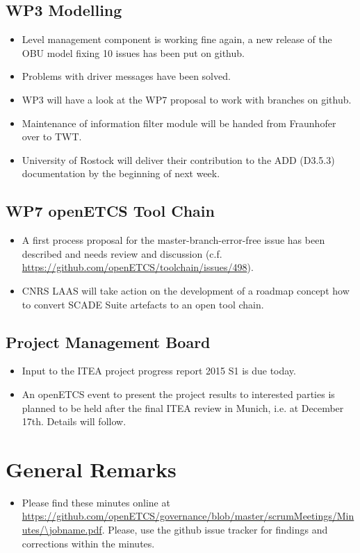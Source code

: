 \documentclass[a4paper, 11pt]{article}
\begin{document}
\subsection{WP3 Modelling}

\begin{itemize}
\item Level management component is working fine again, a new release of the OBU model fixing 10 issues has been put on github.
\item Problems with driver messages have been solved.
\item WP3 will have a look at the WP7 proposal to work with branches on github.
\item Maintenance of information filter module will be handed from Fraunhofer over to TWT.
\item University of Rostock will deliver their contribution to the ADD (D3.5.3) documentation by the beginning of next week.
\end{itemize}

\subsection{WP7 openETCS Tool Chain}

\begin{itemize}
\item A first process proposal for the master-branch-error-free issue has been described and needs review and discussion (c.f. \url{https://github.com/openETCS/toolchain/issues/498}).
\item CNRS LAAS will take action on the development of a roadmap concept how to convert SCADE Suite artefacts to an open tool chain.
\end{itemize}

\subsection{Project Management Board}

\begin{itemize}
\item Input to the ITEA project progress report 2015 S1 is due today.
\item An openETCS event to present the project results to interested parties is planned to be held after the final ITEA review in Munich, i.e. at December 17th. Details will follow.
\end{itemize}


\section{General Remarks}

\begin{itemize}
\item Please find these minutes online at \url{https://github.com/openETCS/governance/blob/master/scrumMeetings/Minutes/\jobname.pdf}. Please, use the github issue tracker for findings and corrections within the minutes.
\end{itemize}
\end{document}
